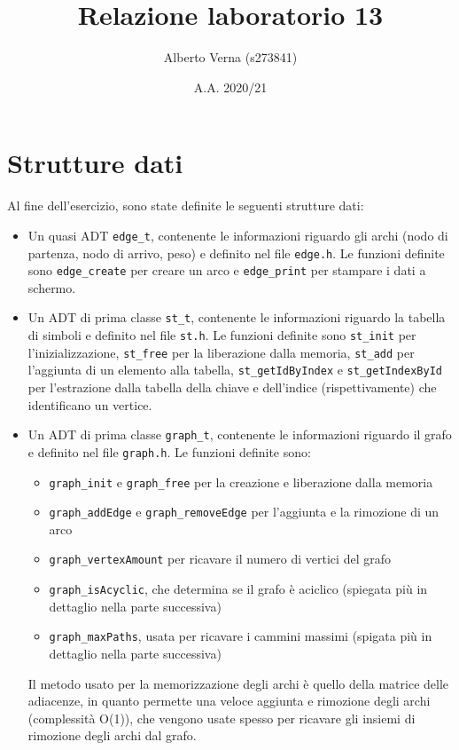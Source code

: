 \documentclass[a4paper]{article}
\title{Relazione laboratorio 13}
\author{Alberto Verna (s273841)}
\date{A.A. 2020/21}
\newcommand{\code}[1]{\texttt{#1}}
\begin{document}
    \maketitle

    \section{Strutture dati}
    Al fine dell'esercizio, sono state definite le seguenti strutture dati:
    \begin{itemize}
        \item Un quasi ADT \code{edge\_t}, contenente le informazioni riguardo gli archi (nodo di partenza, nodo di arrivo, peso) e definito nel file \code{edge.h}. Le funzioni definite sono \code{edge\_create} per creare un arco e \code{edge\_print} per stampare i dati a schermo.
        \item Un ADT di prima classe \code{st\_t}, contenente le informazioni riguardo la tabella di simboli e definito nel file \code{st.h}. Le funzioni definite sono \code{st\_init} per l'inizializzazione, \code{st\_free} per la liberazione dalla memoria, \code{st\_add} per l'aggiunta di un elemento alla tabella, \code{st\_getIdByIndex} e \code{st\_getIndexById} per l'estrazione dalla tabella della chiave e dell'indice (rispettivamente) che identificano un vertice.
        \item Un ADT di prima classe \code{graph\_t}, contenente le informazioni riguardo il grafo e definito nel file \code{graph.h}. Le funzioni definite sono:
            \begin{itemize}
                \item \code{graph\_init} e \code{graph\_free} per la creazione e liberazione dalla memoria
                \item \code{graph\_addEdge} e \code{graph\_removeEdge} per l'aggiunta e la rimozione di un arco
                \item \code{graph\_vertexAmount} per ricavare il numero di vertici del grafo
                \item \code{graph\_isAcyclic}, che determina se il grafo è aciclico (spiegata più in dettaglio nella parte successiva)
                \item \code{graph\_maxPaths}, usata per ricavare i cammini massimi (spigata più in dettaglio nella parte successiva)
            \end{itemize}
            Il metodo usato per la memorizzazione degli archi è quello della matrice delle adiacenze, in quanto permette una veloce aggiunta e rimozione degli archi (complessità O(1)), che vengono usate spesso per ricavare gli insiemi di rimozione degli archi dal grafo.
    \end{itemize}
\end{document}
